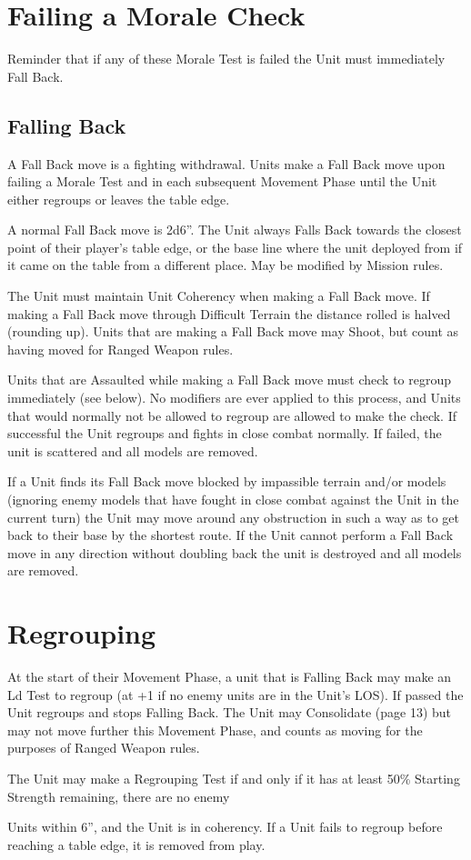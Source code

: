 \section{Failing a Morale Check}
Reminder that if any of these Morale Test is failed the Unit
must immediately Fall Back.

\subsection{Falling Back}
A Fall Back move is a fighting withdrawal. Units make a Fall
Back move upon failing a Morale Test and in each subsequent
Movement Phase until the Unit either regroups or leaves the
table edge.

A normal Fall Back move is 2d6”. The Unit always Falls Back
towards the closest point of their player’s table edge, or the
base line where the unit deployed from if it came on the table
from a different place. May be modified by Mission rules.

The Unit must maintain Unit Coherency when making a Fall
Back move. If making a Fall Back move through Difficult
Terrain the distance rolled is halved (rounding up).
Units that are making a Fall Back move may Shoot, but count
as having moved for Ranged Weapon rules.

Units that are Assaulted while making a Fall Back move must
check to regroup immediately (see below). No modifiers are
ever applied to this process, and Units that would normally not
be allowed to regroup are allowed to make the check. If
successful the Unit regroups and fights in close combat
normally. If failed, the unit is scattered and all models are
removed.

If a Unit finds its Fall Back move blocked by impassible terrain
and/or models (ignoring enemy models that have fought in
close combat against the Unit in the current turn) the Unit may
move around any obstruction in such a way as to get back to
their base by the shortest route. If the Unit cannot perform a
Fall Back move in any direction without doubling back the unit
is destroyed and all models are removed.

\section{Regrouping}

At the start of their Movement Phase, a unit that is Falling Back
may make an Ld Test to regroup (at +1 if no enemy units are
in the Unit's LOS). If passed the Unit regroups and stops
Falling Back. The Unit may Consolidate (page 13) but may not
move further this Movement Phase, and counts as moving for
the purposes of Ranged Weapon rules.

The Unit may make a Regrouping Test if and only if it has at
least 50\% Starting Strength remaining, there are no enemy

Units within 6”, and the Unit is in coherency.
If a Unit fails to regroup before reaching a table edge, it is
removed from play.
